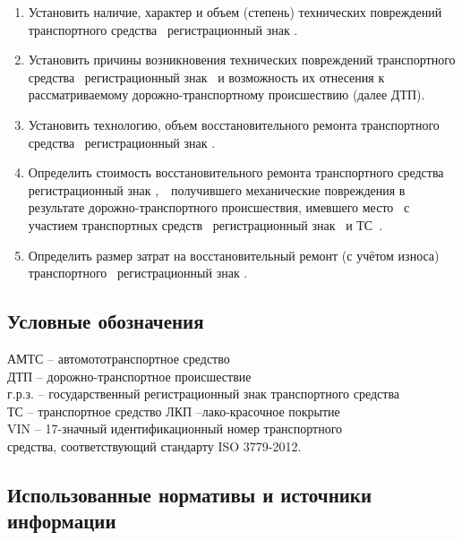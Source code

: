 \begin{enumerate}
\item  Установить наличие, характер и объем (степень) технических повреждений транспортного средства  \tc\, регистрационный знак .
\item  Установить причины возникновения технических повреждений транспортного средства \, регистрационный знак \, и возможность их отнесения к рассматриваемому дорожно-транспортному происшествию (далее ДТП).
\item  Установить технологию, объем восстановительного  ремонта транспортного средства \tc\, регистрационный знак .
\item  Определить стоимость восстановительного ремонта  транспортного средства \tc\, регистрационный знак ,\, \, получившего механические повреждения в результате дорожно-транспортного происшествия, имевшего место \, с участием транспортных средств \, регистрационный знак \, и ТС \,\tca.
\item Определить размер затрат на восстановительный ремонт (с учётом износа) транспортного  \, регистрационный знак .
\end{enumerate}
\subsection{Условные обозначения}

\noindent АМТС – автомототранспортное средство\\
ДТП – дорожно-транспортное происшествие\\
г.р.з. – государственный регистрационный знак транспортного средства\\
ТС – транспортное средство
ЛКП –лако-красочное покрытие\\
VIN – 17-значный идентификационный номер транспортного\\ средства, соответствующий стандарту ISO 3779-2012. 


\subsection{Использованные нормативы и источники информации}

